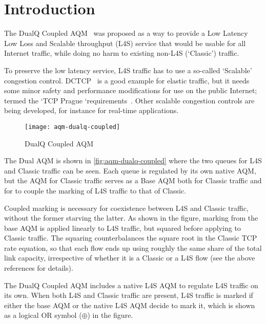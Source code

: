 \section{Introduction}\label{l4saqmtr_intro}

The DualQ Coupled AQM~\cite{DeSchepper15b:DCttH_TR, Briscoe15e:DualQ-Coupled-AQM_ID} was proposed as a way to provide a Low Latency Low Loss and Scalable throughput (L4S) service that would be usable for all Internet traffic, while doing no harm to existing non-L4S (`Classic') traffic. 

To preserve the low latency service, L4S traffic has to use a so-called `Scalable' congestion control. DCTCP~\cite{Alizadeh10:DCTCP} is a good example for elastic traffic, but it needs some minor safety and performance modifications for use on the public Internet; termed the `TCP Prague `requirements~\cite{Briscoe15f:ecn-l4s-id_ID}. Other scalable congestion controls are being developed, for instance for real-time applications.

\begin{figure}[h]
	\centering
	\texttt{[image: aqm-dualq-coupled]}
	\caption{DualQ Coupled AQM}\label{fig:aqm-dualq-coupled}
\end{figure}

The Dual AQM is shown in \autoref{fig:aqm-dualq-coupled} where the two queues for L4S and Classic traffic can be seen. Each queue is regulated by its own native AQM, but the AQM for Classic traffic serves as a Base AQM both for Classic traffic and for to couple the marking of L4S traffic to that of Classic. 

Coupled marking is necessary for coexistence between L4S and Classic traffic, without the former starving the latter. As shown in the figure, marking from the base AQM is applied linearly to L4S traffic, but squared before applying to Classic traffic. The squaring counterbalances the square root in the Classic TCP rate equation, so that each flow ends up using roughly the same share of the total link capacity, irrespective of whether it is a Classic or a L4S flow (see the above references for details).

The DualQ Coupled AQM includes a native L4S AQM to regulate L4S traffic on its own. When both L4S and Classic traffic are present, L4S traffic is marked if either the base AQM or the native L4S AQM decide to mark it, which is shown as a logical OR symbol (\(\oplus\)) in the figure.

